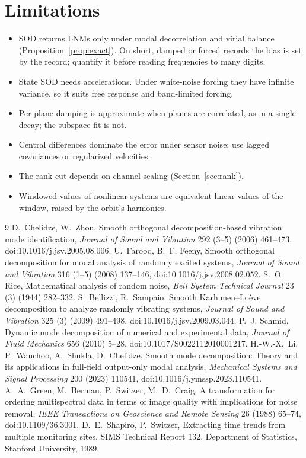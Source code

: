 \documentclass[report]{nld}
\begin{document}
\section{Limitations}
\begin{itemize}
  \item SOD returns LNMs only under modal decorrelation and virial balance
    (Proposition~\ref{prop:exact}). On short, damped or forced records the bias is set by
    the record; quantify it before reading frequencies to many digits.
  \item State SOD needs accelerations. Under white-noise forcing they have infinite
    variance, so it suits free response and band-limited forcing.
  \item Per-plane damping is approximate when planes are correlated, as in a single
    decay; the subspace fit is not.
  \item Central differences dominate the error under sensor noise; use lagged covariances
    or regularized velocities.
  \item The rank cut depends on channel scaling (Section~\ref{sec:rank}).
  \item Windowed values of nonlinear systems are equivalent-linear values of the window,
    raised by the orbit's harmonics.
\end{itemize}

\begin{thebibliography}{9}\small
{} D.~Chelidze, W.~Zhou, Smooth orthogonal decomposition-based
  vibration mode identification, \emph{Journal of Sound and Vibration} 292 (3--5) (2006)
  461--473, doi:10.1016/j.jsv.2005.08.006.
 U.~Farooq, B.~F. Feeny, Smooth orthogonal decomposition for modal
  analysis of randomly excited systems, \emph{Journal of Sound and Vibration} 316 (1--5)
  (2008) 137--146, doi:10.1016/j.jsv.2008.02.052.
 S.~O. Rice, Mathematical analysis of random noise, \emph{Bell System
  Technical Journal} 23 (3) (1944) 282--332.
 S.~Bellizzi, R.~Sampaio, Smooth Karhunen--Lo\`eve decomposition to
  analyze randomly vibrating systems, \emph{Journal of Sound and Vibration} 325 (3) (2009)
  491--498, doi:10.1016/j.jsv.2009.03.044.
 P.~J. Schmid, Dynamic mode decomposition of numerical and
  experimental data, \emph{Journal of Fluid Mechanics} 656 (2010) 5--28,
  doi:10.1017/S0022112010001217.
 H.-W.-X.~Li, P.~Wanchoo, A.~Shukla, D.~Chelidze, Smooth mode decomposition: Theory and its applications in full-field output-only modal analysis, \emph{Mechanical Systems and Signal Processing} 200 (2023) 110541, doi:10.1016/j.ymssp.2023.110541.
 A.~A.~Green, M.~Berman, P.~Switzer, M.~D.~Craig, A transformation for ordering multispectral data in terms of image quality with implications for noise removal, \emph{IEEE Transactions on Geoscience and Remote Sensing} 26 (1988) 65--74, doi:10.1109/36.3001.
 D.~E.~Shapiro, P.~Switzer, Extracting time trends from multiple monitoring sites, SIMS Technical Report 132, Department of Statistics, Stanford University, 1989.
\end{thebibliography}
\end{document}

